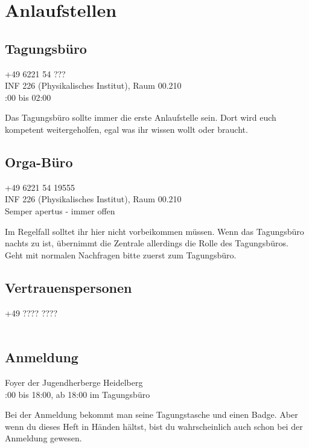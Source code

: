 
\section{Anlaufstellen}

\subsection{Tagungsbüro}
\faPhone \quad +49 6221 54 ???\\ 
\faMapPin \quad INF 226 (Physikalisches Institut), Raum 00.210\\ %
\faClockO {}:00 bis 02:00 %

\noindent Das Tagungsbüro sollte immer die erste Anlaufstelle sein. Dort wird euch kompetent weitergeholfen, egal was ihr wissen wollt oder braucht.

\subsection{Orga-Büro}
\faPhone \quad +49 6221 54 19555\\
\faMapPin \quad INF 226 (Physikalisches Institut), Raum 00.210\\
\faClockO \quad Semper apertus - immer offen

\noindent Im Regelfall solltet ihr hier nicht vorbeikommen müssen. Wenn das Tagungsbüro nachts zu ist, übernimmt die Zentrale allerdings die Rolle des Tagungsbüros. Geht mit normalen Nachfragen bitte zuerst zum Tagungsbüro. %

\subsection{Vertrauenspersonen}
\faPhone \quad +49 ???? ????\\  %
\faUsers \quad \\ 

\noindent {}

\subsection{Anmeldung}
\faMapPin \quad Foyer der Jugendherberge Heidelberg\\ %
\faClockO {}:00 bis 18:00, ab 18:00 im Tagungsbüro %

\noindent Bei der Anmeldung bekommt man seine Tagungstasche und einen Badge. Aber wenn du dieses Heft in Händen hältst, bist du wahrscheinlich auch schon bei der Anmeldung gewesen. %

